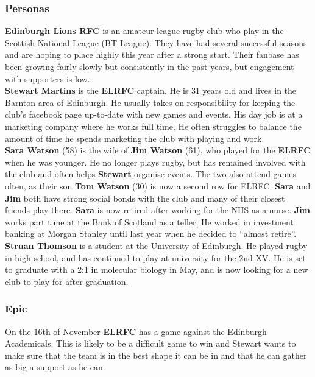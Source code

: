 \documentclass[10pt,a4paper]{article}
\begin{document}
\subsubsection{Personas}


\textbf{Edinburgh Lions RFC} is an amateur league rugby club who play in the Scottish National League (BT League). They have had several successful seasons and are hoping to place highly this year after a strong start. Their fanbase has been growing fairly slowly but consistently in the past years, but engagement with supporters is low. \\


\textbf{Stewart Martins} is the \textbf{ELRFC} captain. He is 31 years old and lives in the Barnton area of Edinburgh. He usually takes on responsibility for keeping the club’s facebook page up-to-date with new games and events. His day job is at a marketing company where he works full time. He often struggles to balance the amount of time he spends marketing the club with playing and work. \\


\textbf{Sara Watson} (58) is the wife of \textbf{Jim Watson} (61), who played for the \textbf{ELRFC} when he was younger. He no longer plays rugby, but has remained involved with the club and often helps \textbf{Stewart} organise events. The two also attend games often, as their son \textbf{Tom Watson} (30) is now a second row for ELRFC. \textbf{Sara} and \textbf{Jim} both have strong social bonds with the club and many of their closest friends play there. \textbf{Sara} is now retired after working for the NHS as a nurse. \textbf{Jim} works part time at the Bank of Scotland as a teller. He worked in investment banking at Morgan Stanley until last year when he decided to “almost retire”. \\


\textbf{Struan Thomson} is a student at the University of Edinburgh. He played rugby in high school, and has continued to play at university for the 2nd XV. He is set to graduate with a 2:1 in molecular biology in May, and is now looking for a new club to play for after graduation.\\

\subsubsection{Epic}
On the 16th of November \textbf{ELRFC} has a game against the Edinburgh Academicals. This is likely to be a difficult game to win and Stewart wants to make sure that the team is in the best shape it can be in and that he can gather as big a support as he can. \\
\end{document}
